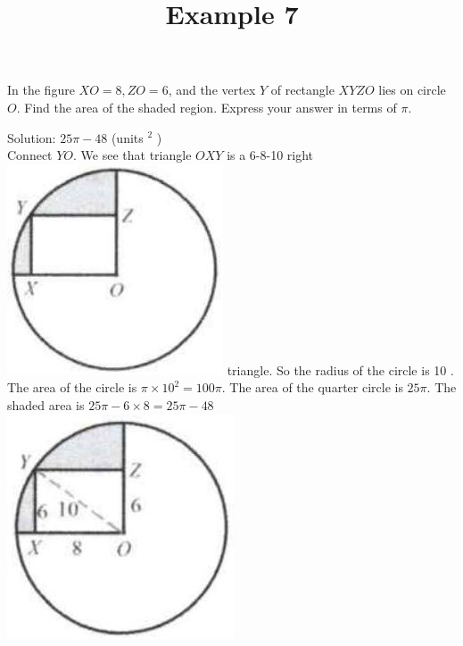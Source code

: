 \documentclass{article}
\title{Example 7}
\date{}
\begin{document}
\maketitle

In the figure \(X O=8, Z O=6\), and the vertex \(Y\) of rectangle \(X Y Z O\) lies on circle \(O\). Find the area of the shaded region. Express your answer in terms of \(\pi\).

Solution: \(25 \pi-48\) (units \({ }^{2}\) )\\
Connect \(Y O\). We see that triangle \(O X Y\) is a 6-8-10 right\\
\includegraphics[width=\textwidth]{images/problem_image_1.jpg} triangle. So the radius of the circle is 10 . The area of the circle is \(\pi \times 10^{2}=100 \pi\). The area of the quarter circle is \(25 \pi\). The shaded area is \(25 \pi-6 \times 8=25 \pi-48\)\\
\centering
\includegraphics[width=\textwidth]{images/reasoning_image_1.jpg}
\end{document}
